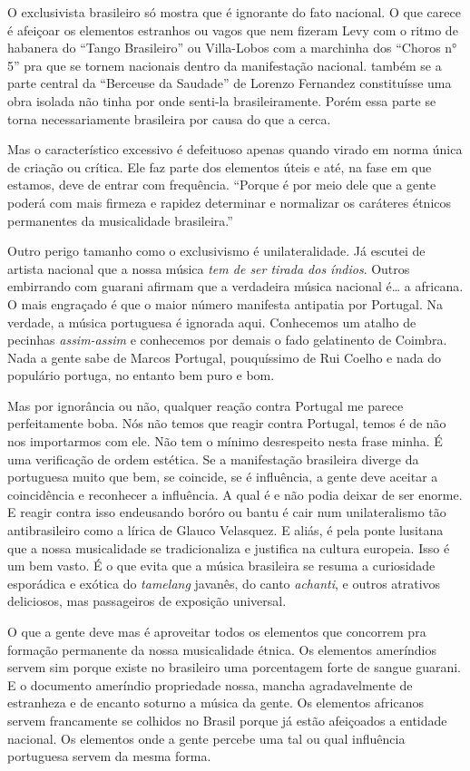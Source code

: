 O exclusivista brasileiro só mostra que é ignorante do fato nacional. O
que carece é afeiçoar os elementos estranhos ou vagos que nem fizeram
Levy com o ritmo de habanera do ``Tango Brasileiro'' ou Villa-Lobos com a
marchinha dos ``Choros n° 5'' pra que se tornem nacionais dentro da
manifestação nacional. também se a parte central da ``Berceuse da
Saudade'' de Lorenzo Fernandez constituísse uma
obra isolada não tinha por onde senti-la brasileiramente. Porém essa
parte se torna necessariamente brasileira por causa do que a cerca.

Mas o característico excessivo é defeituoso apenas quando virado em
norma única de criação ou crítica. Ele faz parte dos elementos úteis e
até, na fase em que estamos, deve de entrar com frequência. ``Porque
é por meio dele que a gente poderá com mais firmeza e rapidez determinar
e normalizar os caráteres étnicos permanentes da musicalidade
brasileira.''

Outro perigo tamanho como o exclusivismo é unilateralidade. Já escutei
de artista nacional que a nossa música \emph{tem de ser tirada dos
índios}. Outros embirrando com guarani afirmam que a verdadeira música
nacional é\ldots{} a africana. O mais engraçado é que o maior número
manifesta antipatia por Portugal. Na verdade, a música portuguesa é
ignorada aqui. Conhecemos um atalho de pecinhas \textit{assim-assim} e conhecemos
por demais o fado gelatinento de Coimbra. Nada a gente sabe de Marcos
Portugal, pouquíssimo de Rui Coelho e nada do populário portuga, no
entanto bem puro e bom.

Mas por ignorância ou não, qualquer reação contra Portugal me parece
perfeitamente boba. Nós não temos que reagir contra Portugal, temos é de
não nos importarmos com ele. Não tem o mínimo desrespeito nesta frase
minha. É uma verificação de ordem estética. Se a manifestação brasileira
diverge da portuguesa muito que bem, se coincide, se é influência, a
gente deve aceitar a coincidência e reconhecer a influência. A qual é e
não podia deixar de ser enorme. E reagir contra isso endeusando boróro
ou bantu é cair num unilateralismo tão antibrasileiro como a lírica de
Glauco Velasquez. E aliás, é pela ponte lusitana que a nossa
musicalidade se tradicionaliza e justifica na cultura europeia. Isso é
um bem vasto. É o que evita que a música brasileira se resuma a
curiosidade esporádica e exótica do \textit{tamelang} javanês, do canto \textit{achanti},
e outros atrativos deliciosos, mas passageiros de exposição universal.

O que a gente deve mas é aproveitar todos os elementos que concorrem pra
formação permanente da nossa musicalidade étnica. Os elementos
ameríndios servem sim porque existe no brasileiro uma porcentagem forte
de sangue guarani. E o documento ameríndio propriedade nossa, mancha
agradavelmente de estranheza e de encanto soturno a música da gente. Os
elementos africanos servem francamente se colhidos no Brasil porque já
estão afeiçoados a entidade nacional. Os elementos onde a gente percebe
uma tal ou qual influência portuguesa servem da mesma forma.

